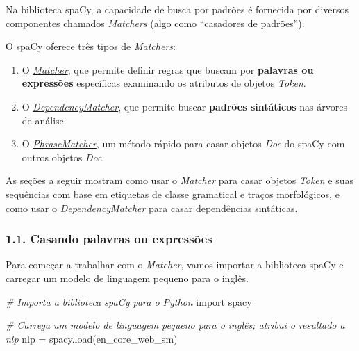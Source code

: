 \documentclass[
  brazilian,
]{article}
\newenvironment{Shaded}{}{}
\newcommand{\CommentTok}[1]{\textcolor[rgb]{0.38,0.63,0.69}{\textit{#1}}}
\newcommand{\ImportTok}[1]{#1}
\newcommand{\NormalTok}[1]{#1}
\newcommand{\OperatorTok}[1]{\textcolor[rgb]{0.40,0.40,0.40}{#1}}
\newcommand{\StringTok}[1]{\textcolor[rgb]{0.25,0.44,0.63}{#1}}
\providecommand{\tightlist}{%
  \setlength{\itemsep}{0pt}\setlength{\parskip}{0pt}}
\begin{document}
Na biblioteca spaCy, a capacidade de busca por padrões é fornecida por
diversos componentes chamados \emph{Matchers} (algo como ``casadores de
padrões'').

O spaCy oferece três tipos de \emph{Matchers}:

\begin{enumerate}
\def\labelenumi{\arabic{enumi}.}
\tightlist
\item
  O \href{https://spacy.io/api/matcher}{\emph{Matcher}}, que permite
  definir regras que buscam por \textbf{palavras ou expressões}
  específicas examinando os atributos de objetos \emph{Token}.
\item
  O
  \href{https://spacy.io/api/dependencymatcher}{\emph{DependencyMatcher}},
  que permite buscar \textbf{padrões sintáticos} nas árvores de análise.
\item
  O \href{https://spacy.io/api/phrasematcher}{\emph{PhraseMatcher}}, um
  método rápido para casar objetos \emph{Doc} do spaCy com outros
  objetos \emph{Doc}.
\end{enumerate}

As seções a seguir mostram como usar o \emph{Matcher} para casar objetos
\emph{Token} e suas sequências com base em etiquetas de classe
gramatical e traços morfológicos, e como usar o \emph{DependencyMatcher}
para casar dependências sintáticas.

\hypertarget{casando-palavras-ou-expressuxf5es}{%
\subsubsection{1.1. Casando palavras ou
expressões}\label{casando-palavras-ou-expressuxf5es}}

Para começar a trabalhar com o \emph{Matcher}, vamos importar a
biblioteca spaCy e carregar um modelo de linguagem pequeno para o
inglês.

\begin{Shaded}
\begin{Highlighting}[]
\CommentTok{\# Importa a biblioteca spaCy para o Python}
\ImportTok{import}\NormalTok{ spacy}

\CommentTok{\# Carrega um modelo de linguagem pequeno para o inglês; atribui o resultado a \textquotesingle{}nlp\textquotesingle{}}
\NormalTok{nlp }\OperatorTok{=}\NormalTok{ spacy.load(}\StringTok{\textquotesingle{}en\_core\_web\_sm\textquotesingle{}}\NormalTok{)}
\end{Highlighting}
\end{Shaded}
\end{document}
